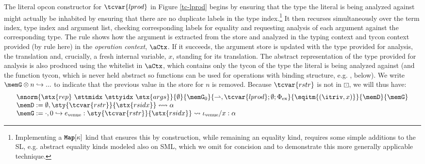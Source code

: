 The literal opcon constructor for $\tcvar{lprod}$ in Figure \ref{tc-lprod} begins by ensuring that the type the literal is being analyzed against might actually be inhabited by ensuring that there are no duplicate labels in the type index.\footnote{Implementing a $\texttt{\textbf{Map}}[\kappa]$ kind that ensures this by construction, while remaining an equality kind, requires some simple additions to the SL, e.g. abstract equality kinds modeled also on SML, which we omit for concision and to demonstrate this more generally applicable technique.} It then recurses simultaneously over the term index, type index and argument list, checking corresponding labels for equality and requesting analysis of each argument against the corresponding type. The rule  shows how the argument is extracted from the store and analyzed in the typing context and tycon context provided (by rule  here) in the \emph{operation context}, $\aCtx$. If it succeeds, the argument store is updated with the type provided for analysis, the translation and, crucially, a fresh internal variable, $x$, standing for its translation. The abstract representation of the type provided for analysis is also produced using the whitelist in $\aCtx$, which contains only the tycon of the type the literal is being analyzed against (and the function tycon, which is never held abstract so functions can be used for operations with binding structure, e.g. , below). We write $\memG \otimes n \hookrightarrow ...$ to indicate that the previous value in the store for $n$ is removed. Because $\tcvar{rstr}$ is not in $\boxdot$, we will thus have:\[\begin{array}{l}
\snorm{\stx{rep}~\sttmidx~\sttyidx~\stx{args}}{\emptyset}{\memG_0}{{\rightharpoonup},\tcvar{lprod}; \emptyset; \Phi_\text{ex}}{\sqitm{\ipair{\itriv}{x}}}{\memD}{\memG}\\
\memD := \emptyset, \sty{\tcvar{rstr}}{\stx{rsidx}} \leftrightsquigarrow \alpha\\
\memG := \cdot, 0 \hookrightarrow e_\text{venue} : \sty{\tcvar{rstr}}{\stx{rsidx}} \leadsto \iota_\text{venue}/x : \alpha
\end{array}
\]\normalsize

